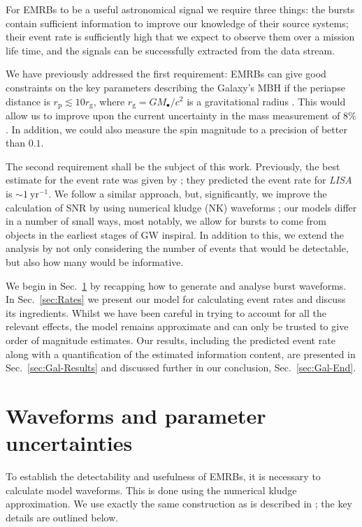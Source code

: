 \documentclass[useAMS,usedcolumn,usegraphicx,usenatbib]{mn2e}
\newcommand{\secref}[1]{Sec.~\ref{sec:#1}}
\newcommand{\units}[1]{\ensuremath{~\mathrm{#1}}}
\newcommand{\sub}[1]{\ensuremath{_\mathrm{#1}}}
\begin{document}
For EMRBs to be a useful astronomical signal we require three things: the bursts contain sufficient information to improve our knowledge of their source systems; their event rate is sufficiently high that we expect to observe them over a mission life time, and the signals can be successfully extracted from the data stream.

We have previously addressed the first requirement: EMRBs can give good constraints on the key parameters describing the Galaxy's MBH if the periapse distance is $r\sub{p} \lesssim 10 r\sub{g}$, where $r\sub{g} = GM_\bullet/c^2$ is a gravitational radius \citep{Berry2013}. This would allow us to improve upon the current uncertainty in the mass measurement of $8\%$ \citep{Gillessen2009}. In addition, we could also measure the spin magnitude to a precision of better than $0.1$.

The second requirement shall be the subject of this work. Previously, the best estimate for the event rate was given by \citet*{Hopman2007}; they predicted the event rate for \textit{LISA} is $\sim 1\units{yr^{-1}}$. We follow a similar approach, but, significantly, we improve the calculation of SNR by using numerical kludge (NK) waveforms \citep{Babak2007}; our models differ in a number of small ways, most notably, we allow for bursts to come from objects in the earliest stages of GW inspiral. In addition to this, we extend the analysis by not only considering the number of events that would be detectable, but also how many would be informative.

We begin in \secref{Waveforms} by recapping how to generate and analyse burst waveforms. In \secref{Rates} we present our model for calculating event rates and discuss its ingredients. Whilst we have been careful in trying to account for all the relevant effects, the model remains approximate and can only be trusted to give order of magnitude estimates. Our results, including the predicted event rate along with a quantification of the estimated information content, are presented in \secref{Gal-Results} and discussed further in our conclusion, \secref{Gal-End}.

\section{Waveforms and parameter uncertainties}\label{sec:Waveforms}

To establish the detectability and usefulness of EMRBs, it is necessary to calculate model waveforms. This is done using the numerical kludge approximation. We use exactly the same construction as is described in \citet{Berry2013}; the key details are outlined below.
\end{document}
